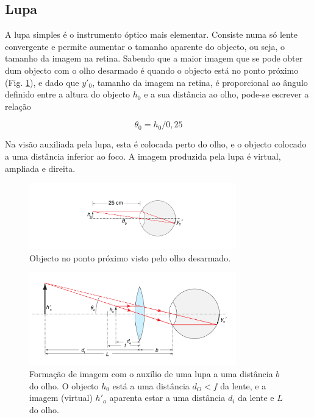 \documentclass[a4paper,12pt]{article}      %
\begin{document}
\subsection{\sf Lupa}

A lupa simples é o instrumento óptico mais elementar. Consiste numa só lente convergente e permite aumentar o tamanho aparente do objecto, ou seja, o tamanho da imagem na retina. Sabendo que a maior imagem que se pode obter dum objecto com o olho desarmado é quando o objecto está no ponto próximo (Fig. \ref{fig:olho-4}), e dado que $y'_0$, tamanho da imagem na retina, é proporcional ao ângulo definido entre a altura do objecto $h_0$ e a sua distância ao olho, pode-se escrever a relação

\begin{equation}
\theta_0=h_0/0,25
\end{equation}

Na visão auxiliada pela lupa, esta é colocada perto do olho, e o objecto colocado a uma distância inferior ao foco. A imagem produzida pela lupa é virtual, ampliada e direita.

\begin{figure}
	[!htb]  \centering 
	\includegraphics[width=0.8\textwidth]{olho-4}
		\caption{Objecto no ponto próximo visto pelo olho desarmado. \label{fig:olho-4}} 
\end{figure}



\begin{figure}
	[!htb]  \centering 
	\includegraphics[width=0.8\textwidth]{olho-5}
	\caption{Formação de imagem com o auxílio de uma lupa a uma distância $b$ do olho. O objecto $h_0$ está a uma distância $d_O<f$ da lente, e a imagem (virtual) $h'_a$ aparenta estar a uma distância $d_i$ da lente e $L$ do olho. \label{fig:olho-5}} 
\end{figure}
\end{document}
